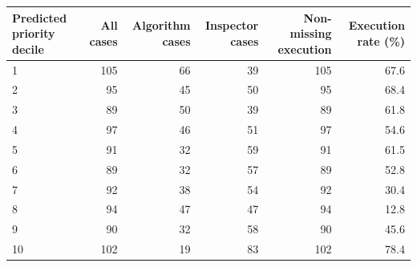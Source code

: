 \begin{tabular}[t]{lrrrrr}
\toprule
Predicted priority decile & All cases & Algorithm cases & Inspector cases & Non-missing execution & Execution rate (\%)\\
\midrule
1 & 105 & 66 & 39 & 105 & 67.6\\
2 & 95 & 45 & 50 & 95 & 68.4\\
3 & 89 & 50 & 39 & 89 & 61.8\\
4 & 97 & 46 & 51 & 97 & 54.6\\
5 & 91 & 32 & 59 & 91 & 61.5\\
6 & 89 & 32 & 57 & 89 & 52.8\\
7 & 92 & 38 & 54 & 92 & 30.4\\
8 & 94 & 47 & 47 & 94 & 12.8\\
9 & 90 & 32 & 58 & 90 & 45.6\\
10 & 102 & 19 & 83 & 102 & 78.4\\
\bottomrule
\end{tabular}
